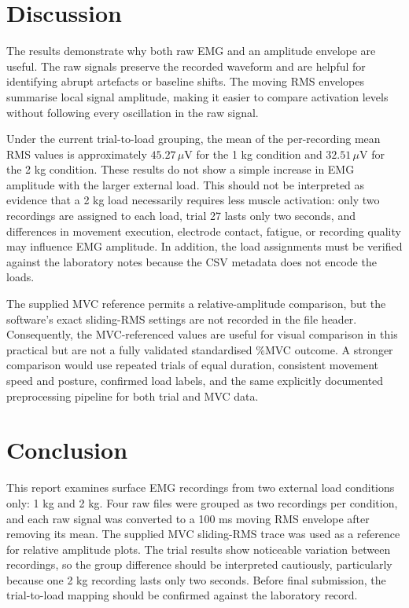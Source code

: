 \documentclass[12pt,a4paper]{article}
\newcommand{\uV}{\ensuremath{\,\mu\mathrm{V}}}
\begin{document}
\section{Discussion}
The results demonstrate why both raw EMG and an amplitude envelope are useful. The raw
signals preserve the recorded waveform and are helpful for identifying abrupt artefacts
or baseline shifts. The moving RMS envelopes summarise local signal amplitude, making
it easier to compare activation levels without following every oscillation in the raw
signal.

Under the current trial-to-load grouping, the mean of the per-recording mean RMS values
is approximately \(45.27\uV\) for the 1 kg condition and \(32.51\uV\) for the 2 kg condition.
These results do not show a simple increase in EMG amplitude with the larger external
load. This should not be interpreted as evidence that a 2 kg load necessarily requires
less muscle activation: only two recordings are assigned to each load, trial 27 lasts
only two seconds, and differences in movement execution, electrode contact, fatigue, or
recording quality may influence EMG amplitude. In addition, the load assignments must be
verified against the laboratory notes because the CSV metadata does not encode the loads.

The supplied MVC reference permits a relative-amplitude comparison, but the software's
exact sliding-RMS settings are not recorded in the file header. Consequently, the
MVC-referenced values are useful for visual comparison in this practical but are not a
fully validated standardised \%MVC outcome. A stronger comparison would use repeated
trials of equal duration, consistent movement speed and posture, confirmed load labels,
and the same explicitly documented preprocessing pipeline for both trial and MVC data.

\section{Conclusion}
This report examines surface EMG recordings from two external load conditions only: 1 kg
and 2 kg. Four raw files were grouped as two recordings per condition, and each raw signal
was converted to a 100 ms moving RMS envelope after removing its mean. The supplied MVC
sliding-RMS trace was used as a reference for relative amplitude plots. The trial results
show noticeable variation between recordings, so the group difference should be
interpreted cautiously, particularly because one 2 kg recording lasts only two seconds.
Before final submission, the trial-to-load mapping should be confirmed against the
laboratory record.
\end{document}
